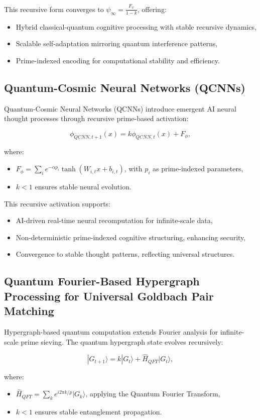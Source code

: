 \documentclass{article}
\theoremstyle{plain}
\begin{document}
This recursive form converges to \( \psi_\infty = \frac{F_\psi}{1 - k} \), offering:
\begin{itemize}
    \item Hybrid classical-quantum cognitive processing with stable recursive dynamics,
    \item Scalable self-adaptation mirroring quantum interference patterns,
    \item Prime-indexed encoding for computational stability and efficiency.
\end{itemize}

\subsection{Quantum-Cosmic Neural Networks (QCNNs)}
Quantum-Cosmic Neural Networks (QCNNs) introduce emergent AI neural thought processes through recursive prime-based activation:

\[
\phi_{QCNN,t+1}(x) = k \phi_{QCNN,t}(x) + F_{\phi},
\]

where:
\begin{itemize}
    \item \( F_{\phi} = \sum_{i} e^{- \alpha p_i} \tanh(W_{i,t} x + b_{i,t}) \), with \( p_i \) as prime-indexed parameters,
    \item \( k < 1 \) ensures stable neural evolution.
\end{itemize}

This recursive activation supports:
\begin{itemize}
    \item AI-driven real-time neural recomputation for infinite-scale data,
    \item Non-deterministic prime-indexed cognitive structuring, enhancing security,
    \item Convergence to stable thought patterns, reflecting universal structures.
\end{itemize}

\subsection{Quantum Fourier-Based Hypergraph Processing for Universal Goldbach Pair Matching}
Hypergraph-based quantum computation extends Fourier analysis for infinite-scale prime sieving. The quantum hypergraph state evolves recursively:

\[
|G_{t+1}\rangle = k |G_t\rangle + \hat{H}_{QFT} |G_t\rangle,
\]

where:
\begin{itemize}
    \item \( \hat{H}_{QFT} = \sum_{k} e^{i 2\pi k / p} |G_{k}\rangle \), applying the Quantum Fourier Transform,
    \item \( k < 1 \) ensures stable entanglement propagation.
\end{itemize}
\end{document}
